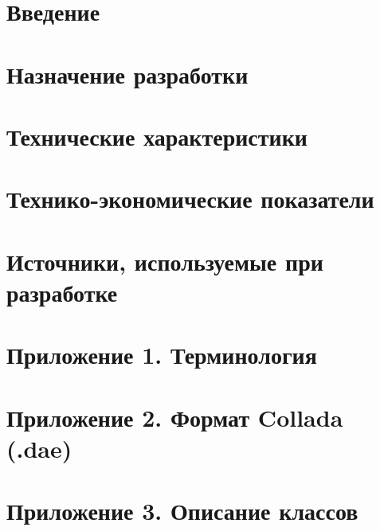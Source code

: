 \documentclass[
encoding=utf8
]{../twoeskd}
\newcommand{\+}{\discretionary{\mbox{\scriptsize$\hookleftarrow$}}{}{}}
\begin{document}

% 

\newpage
{}
\tableofcontents

\newpage
\section{Введение}


\newpage
\section{Назначение разработки}


\newpage
\section{Технические характеристики}


\newpage
\section{Технико-экономические показатели}


\newpage
\section{Источники, используемые при разработке}


\newpage
\section{Приложение 1. Терминология}


\newpage
\section{Приложение 2. Формат Collada (.dae)}


\newpage
\section{Приложение 3. Описание классов}


\newpage

\eskdListOfChanges

\end{document}
